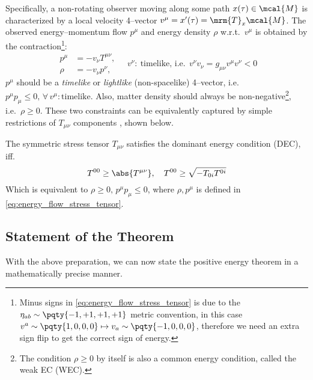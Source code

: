 \documentclass[a4paper,11pt]{article}
\begin{document}
	Specifically, a non-rotating observer moving along some path $x(\tau)\in\mcal{M}$ is characterized by a local velocity 4--vector $v^\mu = x'(\tau) = \mrm{T}_x \mcal{M}$. The observed energy--momentum flow $p^\mu$ and energy density $\rho$ w.r.t.~$v^\mu$ is obtained by the contraction\footnote{
		Minus signs in \eqref{eq:energy_flow_stress_tensor} is due to the $\eta_{ab}\sim\pqty{-1,+1,+1,+1}$ metric convention, in this case $v^a\sim\pqty{1,0,0,0}\mapsto v_a\sim\pqty{-1,0,0,0}$, therefore we need an extra sign flip to get the correct sign of energy. 
	}:
	\begin{equation}
		\begin{aligned}
			p^\mu &= - v_\nu T^{\mu\nu},\\[-.2ex]
			\rho &= - v_\nu p^\nu,
		\end{aligned}\quad%
		v^\nu\colon\ \text{timelike, i.e.}\ \ %
		v^\nu v_\nu
		= g_{\mu\nu} v^\mu v^\nu
		< 0
		\label{eq:energy_flow_stress_tensor}
	\end{equation}
	$p^\mu$ should be a \textit{timelike} or \textit{lightlike} (non-spacelike) 4--vector, i.e.~$p^\mu p_\mu \le 0,\,\forall\,v^\mu\colon\text{timelike}$. Also, matter density should always be non-negative\footnote{
		The condition $\rho\ge 0$ by itself is also a common energy condition, called the weak EC (WEC). 
	}, i.e.~$\rho \ge 0$. These two constraints can be equivalently captured by simple restrictions of $T_{\mu\nu}$ components \cite{Straumann:2013spu}, shown below. 
\pagebreak[4]
	
	\begin{definition*}
		The symmetric stress tensor $T_{\mu\nu}$ satisfies the dominant energy condition (DEC), iff.
		\begin{equation}
			T^{00} \ge \abs{T^{\mu\nu}},\quad
			T^{00} \ge \sqrt{-T_{0i} T^{0i}}
			\label{eq:DEC}
		\end{equation}
		Which is equivalent to $\rho \ge 0,\,p^\mu p_\mu \le 0$, where $\rho,p^\mu$ is defined in \eqref{eq:energy_flow_stress_tensor}. 
	\end{definition*}
\subsection{Statement of the Theorem}
	With the above preparation, we can now state the positive energy theorem in a mathematically precise manner.
	
\end{document}
